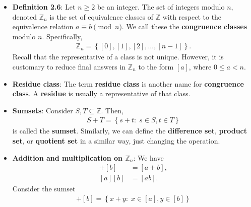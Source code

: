 \documentclass{report}
\begin{document}
\begin{itemize}
\begin{align*}
            ,\end{align*}
            and if $b \in [a]$, $[a] = [b]$. Thus, for the equivalence relation $a \equiv b \pmod{n}$, let $a \in \mathbb{Z}$, then the equivalence class $[a]$ is 
            \begin{align*}
                [a] &= \left\{b \in \mathbb{Z}:\; a \equiv b \pmod{n}\right\} = \left\{a + nk:\; k \in \mathbb{Z}\right\}
            .\end{align*}
            So, the integers $b \in \mathbb{Z}$ with the same remainder when divided by $n$ makes up the equivalence class for $a$. $\endpf$
        \item \textbf{Definition 2.6}: Let $n \geq 2$ be an integer. The set of integers modulo $n$, denoted $ \mathbb{Z}_{n}$ is the set of equivalence classes of $ \mathbb{Z}$ with respect to the equivalence relation $a \equiv b \pmod{n}$. We call these the \textbf{congruence classes} modulo $n$. Specifically,  
            \begin{align*}
                \mathbb{Z}_{n} = \left\{[0], [1], [2], \dots, [n-1]\right\}
            .\end{align*}
            Recall that the representative of a class is not unique. However,  it is customary to reduce final answers in $ \mathbb{Z}_{n}$ to the form $[a]$, where $ 0 \leq a < n$.
        \item \textbf{Residue class}: The term \textbf{residue class} is another name for \textbf{congruence class}. A \textbf{residue} is usually a representative of that class.
        \item \textbf{Sumsets}: Consider $S, T \subseteq \mathbb{Z}$. Then, 
            \begin{align*}
                S + T  = \left\{s + t:\; s \in S, t \in T\right\}
            \end{align*}
            is called the \textbf{sumset}. Similarly, we can define the \textbf{difference set}, \textbf{product set}, or \textbf{quotient set} in a similar way, just changing the operation.
        \item \textbf{Addition and multiplication on $\mathbb{Z}_{n}$}: We have
            \begin{align*}
                [a] + [b] &= [a+b], \\
                [a][b] &= [ab]
            .\end{align*}
            Consider the sumset
            \begin{align*}
                [a] + [b] = \left\{x + y:\; x \in [a], y \in [b]\right\}

\end{align*}
\end{itemize}
\end{document}
